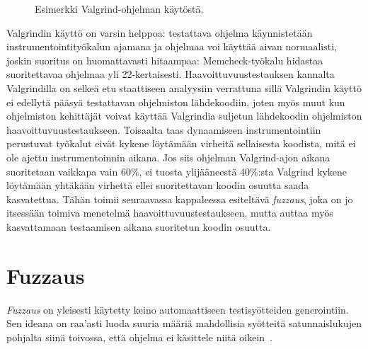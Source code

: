 \begin{figure}[H]



\caption{Esimerkki Valgrind-ohjelman käytöstä.}
\label{ValgrindEsimerkki}
\end{figure}

Valgrindin käyttö on varsin helppoa:
testattava ohjelma käynnistetään instrumentointityökalun ajamana ja ohjelmaa voi käyttää aivan normaalisti,
joskin suoritus on huomattavasti hitaampaa:
Memcheck-työkalu hidastaa suoritettavaa ohjelmaa yli 22-kertaisesti.
Haavoittuvuustestauksen kannalta Valgrindilla on selkeä etu staattiseen analyysiin verrattuna sillä
Valgrindin käyttö ei edellytä pääsyä testattavan ohjelmiston lähdekoodiin,
joten myös muut kun ohjelmiston kehittäjät voivat käyttää Valgrindia suljetun lähdekoodin ohjelmiston haavoittuvuustestaukseen.
Toisaalta taas dynaamiseen instrumentointiin perustuvat työkalut eivät kykene löytämään virheitä
sellaisesta koodista, mitä ei ole ajettu instrumentoinnin aikana.
Jos siis ohjelman Valgrind-ajon aikana suoritetaan vaikkapa vain 60\%,
ei tuosta ylijääneestä 40\%:sta Valgrind kykene löytämään yhtäkään virhettä
ellei suoritettavan koodin osuutta saada kasvatettua.
Tähän toimii seuraavassa kappaleessa esiteltävä \emph{fuzzaus},
joka on jo itsessään toimiva menetelmä haavoittuvuustestaukseen,
mutta auttaa myös kasvattamaan testaamisen aikana suoritetun koodin osuutta.

\section{Fuzzaus}
\label{Fuzzaus}

\emph{Fuzzaus} on yleisesti käytetty keino automaattiseen testisyötteiden generointiin.
Sen ideana on raa'asti luoda suuria määriä mahdollisia syötteitä satunnaislukujen pohjalta siinä toivossa,
että ohjelma ei käsittele niitä oikein~\cite{UnixReliability}.

